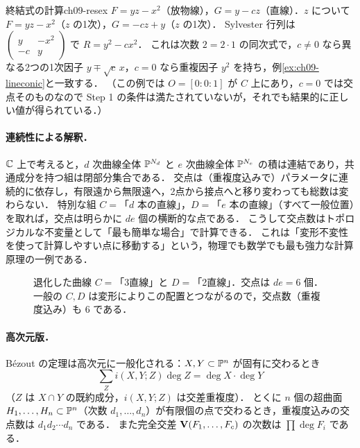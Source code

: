 \begin{myex}{終結式の計算}{ch09-resex}
$F=yz-x^2$（放物線），$G=y-cz$（直線）．$z$ について $F=yz-x^2$（$z$ の1次），$G=-cz+y$（$z$ の1次）．
Sylvester 行列は $\begin{pmatrix}y&-x^2\\-c&y\end{pmatrix}$ で $R=y^2-cx^2$．
これは次数 $2=2\cdot1$ の同次式で，$c\neq0$ なら異なる2つの1次因子 $y\mp\sqrt c\,x$，$c=0$ なら重複因子 $y^2$ を持ち，例\ref{ex:ch09-lineconic}と一致する．
（この例では $O=[0:0:1]$ が $C$ 上にあり，$c=0$ では交点そのものなので Step 1 の条件は満たされていないが，それでも結果的に正しい値が得られている．）
\end{myex}

\paragraph{連続性による解釈．}
$\mathbb{C}$ 上で考えると，$d$ 次曲線全体 $\mathbb{P}^{N_d}$ と $e$ 次曲線全体 $\mathbb{P}^{N_e}$ の積は連結であり，共通成分を持つ組は閉部分集合である．
交点は（重複度込みで）パラメータに連続的に依存し，有限遠から無限遠へ，2点から接点へと移り変わっても総数は変わらない．
特別な組 $C=$「$d$ 本の直線」，$D=$「$e$ 本の直線」（すべて一般位置）を取れば，交点は明らかに $de$ 個の横断的な点である．
こうして交点数はトポロジカルな不変量として「最も簡単な場合」で計算できる．
これは「変形不変性を使って計算しやすい点に移動する」という，物理でも数学でも最も強力な計算原理の一例である．

\begin{figure}[htbp]
\centering
{}
\caption{退化した曲線 $C=$「3直線」と $D=$「2直線」．交点は $de=6$ 個．一般の $C,D$ は変形によりこの配置とつながるので，交点数（重複度込み）も $6$ である．}
\label{fig:ch09-lines}
\end{figure}

\paragraph{高次元版．}
B\'ezout の定理は高次元に一般化される：$X,Y\subset\mathbb{P}^n$ が固有に交わるとき
\[
  \sum_{Z}i(X,Y;Z)\deg Z=\deg X\cdot\deg Y
\]
（$Z$ は $X\cap Y$ の既約成分，$i(X,Y;Z)$ は交差重複度）．
とくに $n$ 個の超曲面 $H_1,\dots,H_n\subset\mathbb{P}^n$（次数 $d_1,\dots,d_n$）が有限個の点で交わるとき，重複度込みの交点数は $d_1d_2\cdots d_n$ である．
また完全交差 $\mathbf{V}(F_1,\dots,F_c)$ の次数は $\prod\deg F_i$ である．

